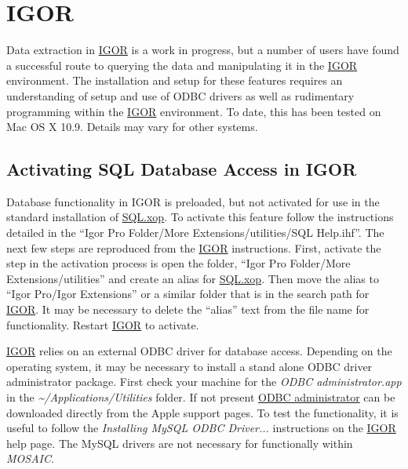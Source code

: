 \documentclass[letterpaper,10pt,english]{sphinxmanual}
\begin{document}
\section{IGOR}
\label{doc/Addons:igor-addons-sec}\label{doc/Addons:id26}
Data extraction in \href{http://www.wavemetrics.com/products/igorpro/igorpro.htm}{IGOR} is a work in progress, but a number of users have found a successful route to querying the data and manipulating it in the \href{http://www.wavemetrics.com/products/igorpro/igorpro.htm}{IGOR} environment.  The installation and setup for these features requires an understanding of setup and use of ODBC drivers as well as rudimentary programming within the \href{http://www.wavemetrics.com/products/igorpro/igorpro.htm}{IGOR} environment.  To date, this has been tested on Mac OS X 10.9.  Details may vary for other systems.


\subsection{Activating SQL Database Access in IGOR}
\label{doc/Addons:activating-sql-database-access-in-igor}
Database functionality in IGOR is preloaded, but not activated for use in the standard installation of \href{http://www.wavemetrics.com/products/igorpro/dataaccess/sql.htm}{SQL.xop}.  To activate this feature follow the instructions detailed in the ``Igor Pro Folder/More Extensions/utilities/SQL Help.ihf''.  The next few steps are reproduced from the \href{http://www.wavemetrics.com/products/igorpro/igorpro.htm}{IGOR} instructions.   First, activate the  step in the activation process is open the folder, ``Igor Pro Folder/More Extensions/utilities'' and create an alias for \href{http://www.wavemetrics.com/products/igorpro/dataaccess/sql.htm}{SQL.xop}.  Then move the alias to ``Igor Pro/Igor Extensions'' or a similar folder that is in the search path for \href{http://www.wavemetrics.com/products/igorpro/igorpro.htm}{IGOR}.  It may be necessary to delete the ``alias'' text from the file name for functionality.  Restart \href{http://www.wavemetrics.com/products/igorpro/igorpro.htm}{IGOR} to activate.

\href{http://www.wavemetrics.com/products/igorpro/igorpro.htm}{IGOR} relies on an external ODBC driver for database access.  Depending on the operating system, it may be necessary to install a stand alone ODBC driver administrator package. First check your machine for the \emph{ODBC administrator.app} in the \emph{\textasciitilde{}/Applications/Utilities} folder.  If not present \href{http://support.apple.com/kb/DL895}{ODBC administrator} can be downloaded directly from the Apple support pages.  To test the functionality, it is useful to follow the \emph{Installing MySQL ODBC Driver...} instructions on the \href{http://www.wavemetrics.com/products/igorpro/igorpro.htm}{IGOR} help page.  The MySQL drivers are not necessary for functionally within \emph{MOSAIC}.
\end{document}
